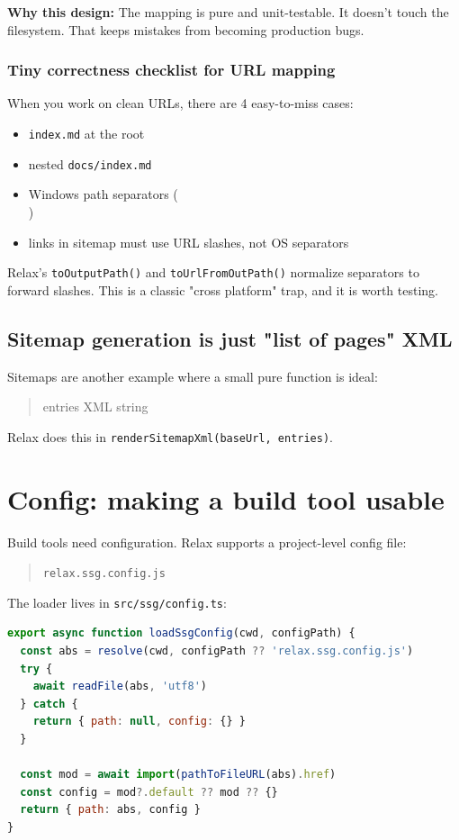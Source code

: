 \textbf{Why this design:}
The mapping is pure and unit-testable.
It doesn't touch the filesystem.
That keeps mistakes from becoming production bugs.

\subsubsection{Tiny correctness checklist for URL mapping}
When you work on clean URLs, there are 4 easy-to-miss cases:

\begin{itemize}
  \item \texttt{index.md} at the root
  \item nested \texttt{docs/index.md}
  \item Windows path separators (\texttt{\\})
  \item links in sitemap must use URL slashes, not OS separators
\end{itemize}

Relax's \texttt{toOutputPath()} and \texttt{toUrlFromOutPath()} normalize separators to forward slashes.
This is a classic "cross platform" trap, and it is worth testing.

\subsection{Sitemap generation is just "list of pages" \textrightarrow XML}
Sitemaps are another example where a small pure function is ideal:

\begin{quote}
entries \textrightarrow XML string
\end{quote}

Relax does this in \texttt{renderSitemapXml(baseUrl, entries)}.

\section{Config: making a build tool usable}
Build tools need configuration.
Relax supports a project-level config file:

\begin{quote}
\texttt{relax.ssg.config.js}
\end{quote}

The loader lives in \texttt{src/ssg/config.ts}:

\begin{lstlisting}[style=relax,language=JavaScript,caption={Loading \texttt{relax.ssg.config.js} via dynamic import (from \texttt{src/ssg/config.ts}).}]
export async function loadSsgConfig(cwd, configPath) {
  const abs = resolve(cwd, configPath ?? 'relax.ssg.config.js')
  try {
    await readFile(abs, 'utf8')
  } catch {
    return { path: null, config: {} }
  }

  const mod = await import(pathToFileURL(abs).href)
  const config = mod?.default ?? mod ?? {}
  return { path: abs, config }
}
\end{lstlisting}

